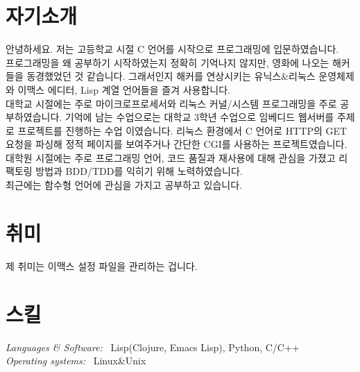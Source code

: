 \documentclass[line,margin]{res}
\begin{document}
\address{E-mail: vmfhrmfoaj@yahoo.com}


\begin{resume}

  \section{자기소개}

  안녕하세요.
  저는 고등학교 시절 C 언어를 시작으로 프로그래밍에 입문하였습니다. \\
  프로그래밍을 왜 공부하기 시작하였는지 정확히 기억나지 않지만, 영화에 나오는 해커들을 동경했었던 것 같습니다.
  그래서인지 해커를 연상시키는 유닉스\&리눅스 운영체제와 이맥스 에디터, Lisp 계열 언어들을 즐겨 사용합니다. \\
  대학교 시절에는 주로 마이크로프로세서와 리눅스 커널/시스템 프로그래밍을 주로 공부하였습니다.
  기억에 남는 수업으로는 대학교 3학년 수업으로 임베디드 웹서버를 주제로 프로젝트를 진행하는 수업 이였습니다.
  리눅스 환경에서 C 언어로 HTTP의 GET 요청을 파싱해 정적 페이지를 보여주거나 간단한 CGI를 사용하는 프로젝트였습니다. \\
  대학원 시절에는 주로 프로그래밍 언어, 코드 품질과 재사용에 대해 관심을 가졌고
  리팩토링 방법과 BDD/TDD를 익히기 위해 노력하였습니다. \\
  최근에는 함수형 언어에 관심을 가지고 공부하고 있습니다.



  \section{취미}

  제 취미는 이맥스 설정 파일을 관리하는 겁니다.


  \section{스킬}

  {\sl Languages \& Software:} ~Lisp({\small Clojure, Emacs Lisp}), Python, C/C++ \\
  {\sl Operating systems:} ~Linux\&Unix



\end{resume}
\end{document}
